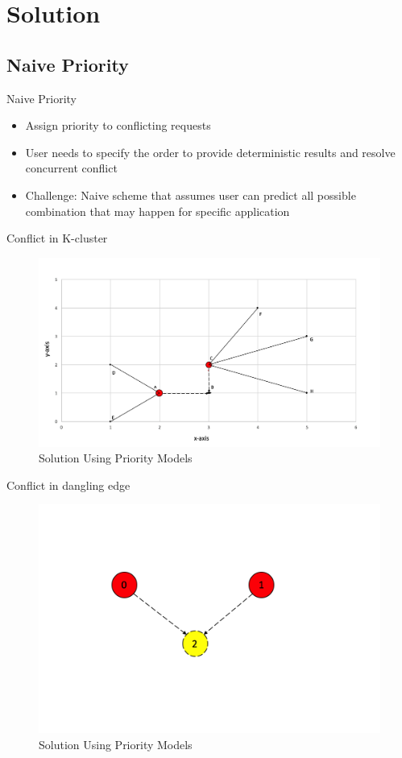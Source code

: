 \section{Solution}
\subsection{Naive Priority}

\begin{frame}{Naive Priority}
  \begin{itemize}
    \item Assign priority to conflicting requests
    \item User needs to specify the order to provide deterministic results and resolve concurrent conflict
    \item Challenge: Naive scheme that assumes user can predict all possible combination that may happen for specific application
  \end{itemize}
  \end{frame}

\begin{frame}
	Conflict in K-cluster
			\begin{figure}
			\includegraphics[width=0.6\linewidth]{figures/priority2.png}
			\caption{Solution Using Priority Models}
			\end{figure}
\end{frame}

\begin{frame}
	Conflict in dangling edge
			\begin{figure}
			\includegraphics[width=0.6\linewidth]{figures/priority1.png}
			\caption{Solution Using Priority Models}
			\end{figure}
\end{frame}

